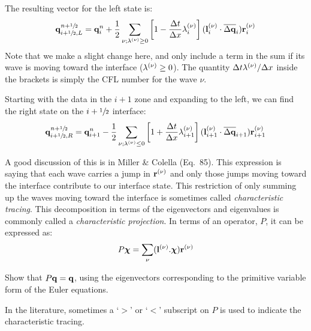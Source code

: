 The resulting vector
for the left state is:
\begin{equation}
{\bf q}_{i+{\sfrac{1}{2}},L}^{n+{\sfrac{1}{2}}} = {\bf q}_i^n + \frac{1}{2} \sum_{\nu; \lambda^{(\nu)} \ge 0}
  \left [ 1 - \frac{\Delta t}{\Delta x} \lambda_i^{(\nu)} \right ] ({\bf l}_i^{(\nu)} \cdot \overline{\Delta {\bf q}}_i) {\bf r}_i^{(\nu)}
\end{equation}
Note that we make a slight change here, and only include a term in the sum if
its wave is moving toward the interface ($\lambda^{(\nu)} \ge 0$).  The quantity
$\Delta t \lambda^{(\nu)}/\Delta x$ inside the brackets is simply the CFL
number for the wave $\nu$.

Starting with the data in the $i+1$ zone and expanding to the left, we can
find the right state on the $i+{\sfrac{1}{2}}$ interface:
\begin{equation}
{\bf q}_{i+{\sfrac{1}{2}},R}^{n+{\sfrac{1}{2}}} = {\bf q}_{i+1}^n - \frac{1}{2} \sum_{\nu; \lambda^{(\nu)} \le 0}
  \left [ 1 + \frac{\Delta t}{\Delta x} \lambda_{i+1}^{(\nu)} \right ] ({\bf l}_{i+1}^{(\nu)} \cdot \overline{\Delta {\bf q}}_{i+1}) {\bf r}_{i+1}^{(\nu)}
\end{equation}


A good discussion of this is in Miller \& Colella
\cite{millercolella:2002} (Eq.\ 85).  This expression is saying that
each wave carries a jump in ${\bf r}^{(\nu)}$ and only those jumps moving
toward the interface contribute to our interface state.  This
restriction of only summing up the waves moving toward the interface
is sometimes called {\em characteristic tracing}.  This decomposition
in terms of the eigenvectors and eigenvalues is commonly called a {\em
  characteristic projection}.  In terms of an operator, $P$, it can be
expressed as:
\begin{equation}
P {\boldsymbol{\chi}} = \sum_\nu ({\bf l}^{(\nu)} . {\boldsymbol{\chi}}) {\bf r}^{(\nu)}
\end{equation}
\begin{exercise}
{
Show that $P {\bf q} = {\bf q}$, using the eigenvectors corresponding to the primitive
 variable form of the Euler equations.}
\end{exercise}
In the literature, sometimes a `$>$' or `$<$' subscript on $P$ is used
to indicate the characteristic tracing.

